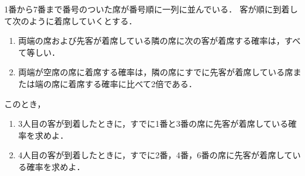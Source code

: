 \documentclass[../../main.tex]{subfiles}
\begin{document}
1番から7番まで番号のついた席が番号順に一列に並んでいる．
客が順に到着して次のように着席していくとする．
\begin{enumerate}
  \item 両端の席および先客が着席している隣の席に次の客が着席する確率は，すべて等しい．
  \item 両端が空席の席に着席する確率は，隣の席にすでに先客が着席している席または端の席に着席する確率に比べて2倍である．
\end{enumerate}
このとき，
\begin{enumerate}
  \item 3人目の客が到着したときに，すでに1番と3番の席に先客が着席している確率を求めよ．
  \item 4人目の客が到着したときに，すでに2番，4番，6番の席に先客が着席している確率を求めよ．
\end{enumerate}
\end{document}
